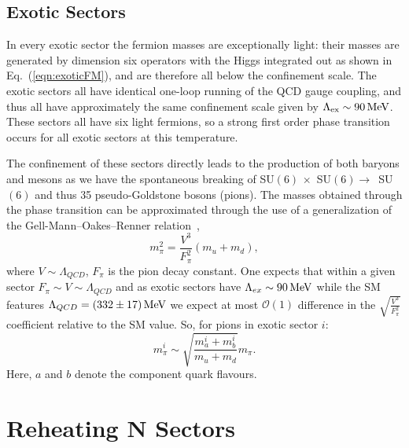 \documentclass[nofootinbib,twocolumn,preprintnumbers]{revtex4-1}
\begin{document}
\subsection{Exotic Sectors}

In every exotic sector the fermion masses are exceptionally light: their masses are generated by dimension six operators with the Higgs integrated out as shown in Eq.~(\ref{eqn:exoticFM}), and are therefore all below the confinement scale. The exotic sectors all have identical one-loop running of the QCD gauge coupling, and thus all have approximately the same confinement scale given by $\Lambda_{\rm ex} \sim 90 \,\mathrm{MeV}$. These sectors all have six light fermions, so a strong first order phase transition occurs for all exotic sectors at this temperature. 

The confinement of these sectors directly leads to the production of both baryons and mesons as we have the spontaneous breaking of SU$(6) \,\times$ SU$(6) \rightarrow\,$ SU$(6)$ and thus 35 pseudo-Goldstone bosons (pions). The masses obtained through the phase transition can be approximated through the use of a generalization of the Gell-Mann--Oakes--Renner relation~\cite{Gell-Mann,Schwartz:2013pla},
\begin{equation}\label{eqn:gmor}
m^2_{\pi} = \frac{V^3}{F^2_{\pi}}(m_u + m_d),
\end{equation}
where $V \sim \Lambda_{QCD}$, $F_\pi$ is the pion decay constant. One expects that within a given sector $F_\pi \sim V \sim \Lambda_{QCD}$ \cite{Schwartz:2013pla} and as exotic sectors have $\Lambda_{ex} \sim 90 \,{\rm MeV}$ while the SM features $\Lambda_{QCD} = (332\pm17)\,{\rm MeV}$ \cite{PhysRevD.98.030001} we expect at most $\mathcal{O}(1)$ difference in the $\sqrt{\frac{V^3}{F_\pi^2}}$ coefficient relative to the SM value. So, for pions in exotic sector $i$:
\begin{equation}
m_{\pi}^i \sim \sqrt{\frac{m_a^i+m_b^i}{m_u + m_d}} m_{\pi}.
\label{eq:ith_pion_mass}
\end{equation}
Here, $a$ and $b$ denote the component quark flavours. 




\section{Reheating N Sectors}
\label{sec:reheat}

\end{document}
